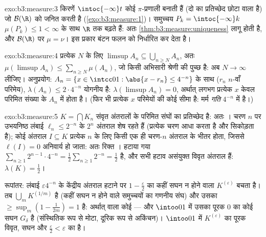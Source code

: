 \begin{solution}{exo:b3:measure:3}
किरणें $\intoc{-\infty}t$ कोई $\pi$-प्रणाली बनाती हैं (दो का प्रतिच्छेद छोटा वाला
है) जो $\mathcal B(\R)$ को जनित करती है (\cref{exo:b3:measure:1})। समुच्चय $P_k = \intoc{-\infty}k$ $\mu(P_k) \leq 1 < \infty$ के साथ $\R$
तक बढ़ते हैं: अतः \cref{thm:b3:measure:uniqueness} लागू होती है, और $\mathcal B(\R)$ पर $\mu = \nu$। इस प्रकार बंटन
फलन  को निर्धारित कर देता है।
\end{solution}

\begin{solution}{exo:b3:measure:4}
प्रत्येक $N$ के लिए $\limsup A_n \subseteq \bigcup_{n \geq N}A_n$, अतः $\mu(\limsup A_n) \leq \sum_{n\geq N}\mu(A_n)$, जो किसी अभिसारी श्रेणी की पुच्छ
है: अब $N \to \infty$ लीजिए। अनुप्रयोग: $A_n = \{x \in \intcc01 : \abs{x - r_n} \leq 4^{-n}\}$ के साथ ($r_n$ $n$-वाँ परिमेय),
$\lambda(A_n) \leq 2\cdot4^{-n}$ योगनीय है: $\lambda(\limsup A_n) = 0$, अर्थात् लगभग प्रत्येक $x$ केवल परिमित संख्या
के $A_n$ में होता है। (फिर भी प्रत्येक $x$ परिमेयों की कोई सीमा है:
मर्म \emph{गति} $4^{-n}$ में है।)
\end{solution}

\begin{solution}{exo:b3:measure:5}
$K = \bigcap K_n$ संवृत अंतरालों के परिमित संघों का प्रतिच्छेद है: अतः । चरण
$n$ पर उभयनिष्ठ लंबाई $\ell_n \leq 2^{-n}$ के $2^n$ अंतराल शेष रहते हैं (प्रत्येक
चरण आधा करता है और सिकोड़ता है); कोई अंतराल $I \subseteq K$ प्रत्येक $n$ के
लिए किसी एक ही चरण-$n$ अंतराल के भीतर होता, जिससे $\ell(I) = 0$ अनिवार्य हो
जाता: अतः रिक्त । हटाया गया  $\sum_{n\geq1}2^{n-1}\cdot
4^{-n} = \frac12\sum_{n\geq1}2^{-n} = \frac12$ है, और सभी हटाव असंयुक्त
विवृत अंतराल हैं: $\lambda(K) = \frac12$।

रूपांतर: लंबाई $\varepsilon
4^{-n}$ के केंद्रीय अंतराल हटाने पर  $1 - \frac\varepsilon2$ का कहीं
सघन न होने वाला  $K^{(\varepsilon)}$ बचता है। तब $\bigcup_m
K^{(1/m)}$  है (कहीं सघन न
होने वाले समुच्चयों का गणनीय संघ) और उसका  $\geq \sup_m(1 - \frac1{2m}) = 1$ है: अर्थात् 
 वाला कोई  --- और $\intoo01$ में उसका पूरक  $0$ का
कोई सघन $G_\delta$ है (संस्थितिक रूप से मोटा, दूरिक रूप से अकिंचन)। $\intoo01$
में $K^{(\varepsilon)}$ का पूरक विवृत, सघन और  $\frac\varepsilon2 < \varepsilon$ का है।
\end{solution}

